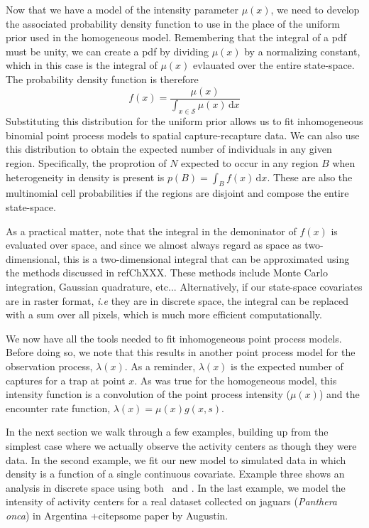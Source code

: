 Now that we have a model of the intensity parameter $\mu(x)$,
we need to develop the associated probability density function to use
in the place of the uniform prior used in the homogeneous
model. Remembering that
the integral of a pdf must be unity, we can create a pdf by dividing
$\mu(x)$ by a normalizing constant, which in this case is the integral
of $\mu(x)$ evlauated over the entire
state-space. The probability density function is therefore
\begin{equation}
f(x) = \frac{\mu(x)}{\int_{x \in \mathcal{S}} \mu(x)\, \mathrm{d}x}
\label{eq:pdf-ipp}
\end{equation}
Substituting this distribution for the
uniform prior allows us to fit inhomogeneous binomial point process
models to spatial capture-recapture data. We can also use this
distribution to obtain the expected number of individuals in any given
region. Specifically, the proprotion of $N$ expected to occur in any
region $B$ when heterogeneity in density is present is $p(B) = \int_B
f(x)\, \mathrm{d}x$. These are
also the multinomial cell probabilities if the regions are
disjoint and compose the entire state-space.

As a practical matter, note that the integral in the
demoninator of $f(x)$ is evaluated over space, and since we almost always regard as
space as two-dimensional, this is a two-dimensional integral that can
be approximated using the methods discussed in ref{ChXXX}. These methods include
Monte Carlo integration, Gaussian quadrature, etc... Alternatively, if
our state-space covariates are in raster format, \emph{i.e} they are
in discrete space, the integral can be replaced with a sum over
all pixels, which is much more efficient
computationally.

We now have all the tools needed to fit inhomogeneous point process
models. Before doing so, we note that this results in another point
process model for the
observation process, $\lambda(x)$. As
a reminder, $\lambda(x)$ is the expected number of captures for a trap
at point $x$. As was true for the homogeneous model, this
intensity function is a convolution of the point process intensity
($\mu(x)$) and the encounter rate function,
$\lambda(x) = \mu(x) g(x,s)$.

In the next section we walk through a few examples, building up from
the simplest case where we actually observe the activity centers as
though they were data. In the second example, we fit our new model to simulated
data in which density is a function of a single continuous
covariate. Example three shows an analysis in discrete space using
both \secr~and \jags. In the last example, we model the intensity of
activity centers for a real dataset collected on jaguars
(\emph{Panthera onca})
in Argentina +citep{some paper by Augustin}.


